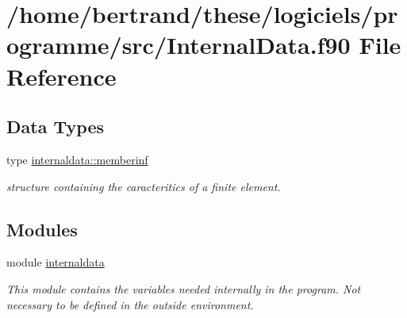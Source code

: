 \hypertarget{_internal_data_8f90}{}\section{/home/bertrand/these/logiciels/programme/src/\+Internal\+Data.f90 File Reference}
\label{_internal_data_8f90}
\subsection*{Data Types}
\begin{DoxyCompactItemize}
\item 
type \hyperlink{structinternaldata_1_1memberinf}{internaldata\+::memberinf}
\begin{DoxyCompactList}\small\item\em structure containing the caracteritics of a finite element. \end{DoxyCompactList}\end{DoxyCompactItemize}
\subsection*{Modules}
\begin{DoxyCompactItemize}
\item 
module \hyperlink{namespaceinternaldata}{internaldata}
\begin{DoxyCompactList}\small\item\em This module contains the variables needed internally in the program. Not necessary to be defined in the outside environment. \end{DoxyCompactList}\end{DoxyCompactItemize}
